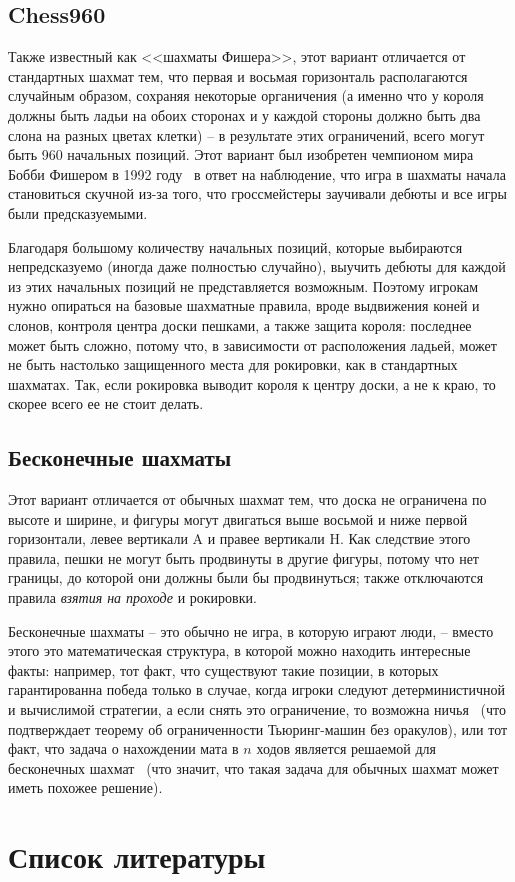 \documentclass{article}
\begin{document}
\subsection{Chess960}

Также известный как <<шахматы Фишера>>, этот вариант
отличается от стандартных шахмат тем, что первая и восьмая горизонталь располагаются случайным образом,
сохраняя некоторые органичения (а именно что у короля должны быть ладьи на обоих сторонах и у каждой стороны должно быть два слона на разных цветах клетки) --
в результате этих ограничений, всего могут быть 960 начальных позиций.
Этот вариант был изобретен чемпионом мира Бобби Фишером в 1992 году~\cite{chess960}
в ответ на наблюдение, что игра в шахматы начала становиться скучной
из-за того, что гроссмейстеры заучивали дебюты 
и все игры были предсказуемыми.

Благодаря большому количеству начальных позиций, 
которые выбираются непредсказуемо (иногда даже полностью случайно),
выучить дебюты для каждой из этих начальных позиций
не представляется возможным.
Поэтому игрокам нужно опираться на базовые шахматные правила,
вроде выдвижения коней и слонов, контроля центра доски пешками,
а также защита короля:
последнее может быть сложно, потому что, в зависимости от расположения ладьей,
может не быть настолько защищенного места для рокировки, как в стандартных шахматах.
Так, если рокировка выводит короля к центру доски, а не к краю, то скорее всего ее не стоит делать.

\subsection{Бесконечные шахматы}

Этот вариант отличается от обычных шахмат тем, 
что доска не ограничена по высоте и ширине,
и фигуры могут двигаться выше восьмой и ниже первой горизонтали,
левее вертикали A и правее вертикали H.
Как следствие этого правила, пешки не могут быть продвинуты в другие фигуры, потому что нет границы, до которой они должны были бы продвинуться;
также отключаются правила \emph{взятия на проходе} и рокировки.

Бесконечные шахматы -- это обычно не игра, в которую играют люди, --
вместо этого это математическая структура, в которой можно находить интересные факты:
например, тот факт, что существуют такие позиции,
в которых гарантированна победа только в случае, когда игроки следуют
детерминистичной и вычислимой стратегии, а если снять это ограничение, то возможна ничья~\cite{transfinite-game-values} 
(что подтверждает теорему об ограниченности Тьюринг-машин без оракулов),
или тот факт, что задача о нахождении мата в $n$ ходов 
является решаемой для бесконечных шахмат~\cite{infinite-mate-in-n}
(что значит, что такая задача для обычных шахмат может иметь похожее решение).






\section{Список литературы}

\printbibliography
\end{document}
